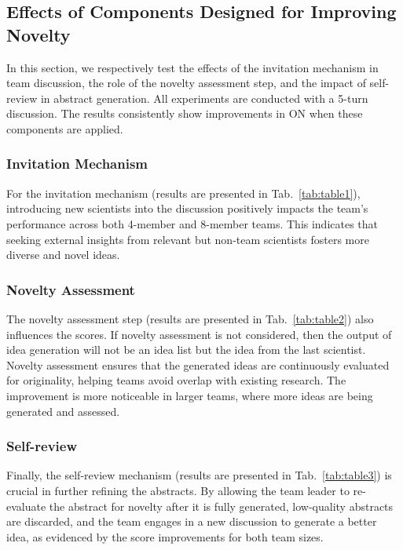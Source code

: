 \documentclass[11pt]{article}
\begin{document}
\subsection{Effects of Components Designed for Improving Novelty}\label{sec:component}
In this section, we respectively test the effects of the invitation mechanism in team discussion, the role of the novelty assessment step, and the impact of self-review in abstract generation. All experiments are conducted with a 5-turn discussion. The results consistently show improvements in ON when these components are applied.  
\subsubsection{Invitation Mechanism}
For the invitation mechanism (results are presented in Tab.~\ref{tab:table1}), introducing new scientists into the discussion positively impacts the team's performance across both 4-member and 8-member teams. This indicates that seeking external insights from relevant but non-team scientists fosters more diverse and novel ideas.
\subsubsection{Novelty Assessment}
The novelty assessment step (results are presented in Tab.~\ref{tab:table2}) also influences the scores. If novelty assessment is not considered, then the output of idea generation will not be an idea list but the idea from the last scientist. Novelty assessment ensures that the generated ideas are continuously evaluated for originality, helping teams avoid overlap with existing research. The improvement is more noticeable in larger teams, where more ideas are being generated and assessed.

\subsubsection{Self-review}
Finally, the self-review mechanism (results are presented in Tab.~\ref{tab:table3}) is crucial in further refining the abstracts. By allowing the team leader to re-evaluate the abstract for novelty after it is fully generated, low-quality abstracts are discarded, and the team engages in a new discussion to generate a better idea, as evidenced by the score improvements for both team sizes.
\end{document}
